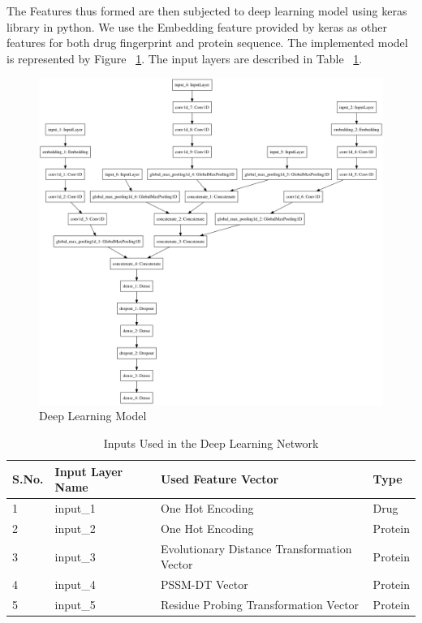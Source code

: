 The Features thus formed are then subjected to deep learning model using keras library in python. We use the Embedding feature provided by keras as other features for both drug fingerprint and protein sequence. The implemented model is represented by Figure ~\ref{fig:dlm}. The input layers are described in Table ~\ref{table:inputs}.

\begin{figure}[ht]
\centering
\includegraphics[width=1\linewidth]{mainmatter/3-Methodology/images/build_combined_categorical_tensor_contact_new.png}
\caption{Deep Learning Model}
\label{fig:dlm}
\end{figure}
\begin{table}[ht]\centering
  \begin{tabular}{|l|l|l|l|}
    
    \hline \label{table:inputs}
    S.No. & Input Layer Name & Used Feature Vector & Type \\ \hline
    1 & input\_1 & One Hot Encoding & Drug \\ \hline
    2 & input\_2 & One Hot Encoding & Protein \\ \hline
    3 & input\_3 & Evolutionary Distance Transformation Vector& Protein \\ \hline
    4 & input\_4 & PSSM-DT Vector & Protein \\ \hline
    5 & input\_5 & Residue Probing Transformation Vector & Protein \\   \hline 
  \end{tabular} 
  \caption{Inputs Used in the Deep Learning Network} 
\end{table}

